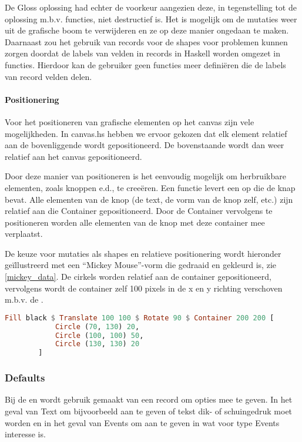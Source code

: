 De Gloss oplossing had echter de voorkeur aangezien deze, in tegenstelling tot de oplossing m.b.v. functies, niet destructief is. Het is mogelijk om de mutaties weer uit de grafische boom te verwijderen en ze op deze manier ongedaan te maken. Daarnaast zou het gebruik van records voor de shapes voor problemen kunnen zorgen doordat de labels van velden in records in Haskell worden omgezet in functies. Hierdoor kan de gebruiker geen functies meer defini\"eren die de labels van record velden delen.

\paragraph{Positionering}
Voor het positioneren van grafische elementen op het canvas zijn vele mogelijkheden. In canvas.hs hebben we ervoor gekozen dat elk element relatief aan de bovenliggende  wordt gepositioneerd. De bovenstaande  wordt dan weer relatief aan het canvas gepositioneerd. 

Door deze manier van positioneren is het eenvoudig mogelijk om herbruikbare elementen, zoals knoppen e.d., te creeëren. Een functie levert een  op die de knap bevat. Alle elementen van de knop (de text, de vorm van de knop zelf, etc.) zijn relatief aan die Container gepositioneerd. Door de Container vervolgens te positioneren worden alle elementen van de knop met deze container mee verplaatst. 

De keuze voor mutaties als shapes en relatieve positionering wordt hieronder geïllustreerd met een ``Mickey Mouse''-vorm die gedraaid en gekleurd is, zie \autoref{mickey_data}. De cirkels worden relatief aan de container gepositioneerd, vervolgens wordt de container zelf 100 pixels in de x en y richting verschoven m.b.v. de . 

\begin{lstlisting}[style=densecode, language=Haskell, caption=Mickey-figuur volgens het Canvas.hs gegevensmodel, label=mickey_data]
Fill black $ Translate 100 100 $ Rotate 90 $ Container 200 200 [
            Circle (70, 130) 20,
            Circle (100, 100) 50,
            Circle (130, 130) 20 
        ]
\end{lstlisting}

\subsubsection{Defaults}
Bij de  en  wordt gebruik gemaakt van een record om opties mee te geven. In het geval van Text om bijvoorbeeld aan te geven of tekst dik- of schuingedruk moet worden en in het geval van Events om aan te geven in wat voor type Events interesse is. 

